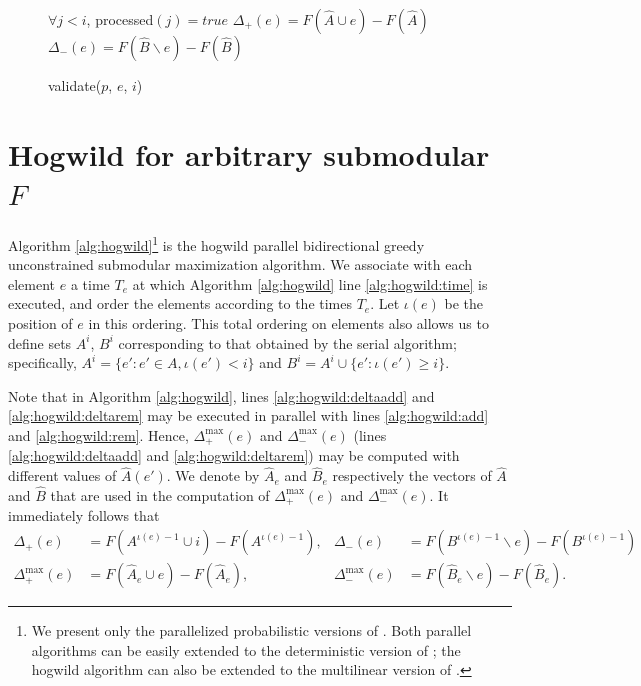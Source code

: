 \documentclass{article} %
\begin{document}
\begin{figure}[h]
\begin{multicols}{2}
\begin{minipage}{0.49\textwidth}
\begin{algorithm}[H]
\DontPrintSemicolon
\caption{validate($p$, $e$, $i$)}
\label{alg:occvalidate}
  \WaitUntil $\forall j < i$, processed$(j) = true$\;
  $\Delta_+(e) = F(\hat{A} \cup e) - F(\hat{A})$\;
  $\Delta_-(e) = F(\hat{B} \backslash e) - F(\hat{B})$\;
\end{algorithm}


  \label{fig:submax}
    \end{minipage}
    
    
    
  \end{multicols}
\end{figure}








\section{Hogwild for arbitrary submodular $F$}
Algorithm \ref{alg:hogwild}\footnote{We present only the parallelized probabilistic versions of \cite{buchbinder2012}. Both parallel algorithms can be easily extended to the deterministic version of \cite{buchbinder2012}; the hogwild algorithm can also be extended to the multilinear version of \cite{buchbinder2012}.} is the hogwild parallel bidirectional greedy unconstrained submodular maximization algorithm.
We associate with each element $e$ a time $T_e$ at which Algorithm \ref{alg:hogwild} line \ref{alg:hogwild:time} is executed, and order the elements according to the times $T_e$.
Let $\iota(e)$ be the position of $e$ in this ordering.
This total ordering on elements also allows us to define sets $A^i$, $B^i$ corresponding to that obtained by the serial algorithm;
specifically, $A^i = \{e' : e' \in A, \iota(e') < i\}$ and $B^i = A^i \cup \{e': \iota(e') \geq i\}$.

Note that in Algorithm \ref{alg:hogwild}, lines \ref{alg:hogwild:deltaadd} and \ref{alg:hogwild:deltarem} may be executed in parallel with lines \ref{alg:hogwild:add} and \ref{alg:hogwild:rem}.
Hence, $\Delta_+^{\max}(e)$ and $\Delta_-^{\max}(e)$ (lines \ref{alg:hogwild:deltaadd} and \ref{alg:hogwild:deltarem}) may be computed with different values of $\hat{A}(e')$.
We denote by $\hat{A}_e$ and $\hat{B}_e$ respectively the vectors of $\hat{A}$ and $\hat{B}$ that are used in the computation of $\Delta_+^{\max}(e)$ and $\Delta_-^{\max}(e)$.
It immediately follows that
\begin{align*}
  \Delta_{+}       (e) &= F(A^{\iota(e)-1}\cup i) - F(A^{\iota(e)-1}),
& \Delta_{-}       (e) &= F(B^{\iota(e)-1}\backslash e) - F(B^{\iota(e)-1})\\
  \Delta_{+}^{\max}(e) &= F(\hat{A}_e\cup e) - F(\hat{A}_e),
& \Delta_{-}^{\max}(e) &= F(\hat{B}_e\backslash e) - F(\hat{B}_e).
\end{align*}
\end{document}
